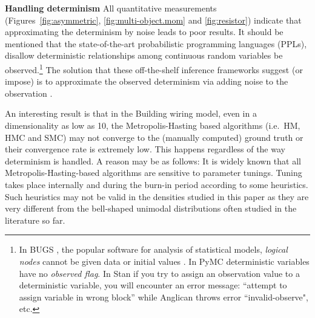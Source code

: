 \documentclass[]{article}
\begin{document}
{\bf Handling determinism}
All quantitative measurements 
(Figures~\ref{fig:asymmetric},  \ref{fig:multi-object.mom} and 
\ref{fig:resistor})
indicate that approximating the determinism by noise leads to poor results.
It should be mentioned that 
the state-of-the-art probabilistic programming languages (PPLs),
disallow deterministic relationships among continuous random variables 
be observed.\footnote{
In BUGS \citep{lunn2009bugs}, the popular software for analysis of statistical models, \emph{logical nodes} cannot be given data or initial values .
In PyMC \citep{patil2010pymc} deterministic variables have no \emph{observed flag}. 
In Stan \citep{stan-manual:2014} 
if you try to assign an observation value to a deterministic variable, you will encounter an error message: 
``attempt to assign variable in wrong block'' while 
Anglican \citep{wood2014new} throws error ``invalid-observe", etc.}
The solution that these off-the-shelf inference frameworks suggest (or impose) is to approximate the observed determinism via adding noise to the observation 
\citep{wood2014new}.





An interesting result is that in the Building wiring model, even in a dimensionality as low as 10, 
the Metropolis-Hasting based algorithms (i.e.\ HM, HMC and SMC) may not converge to the (manually computed) ground truth or their convergence rate is extremely low. 
This happens regardless of the way determinism is handled. 
A reason may be as follows:
It is widely known that all Metropolis-Hasting-based algorithms are sensitive to parameter tunings.
Tuning takes place internally and during the burn-in period according to some heuristics.
Such heuristics may not be valid in the densities studied in this paper as they are very different from the bell-shaped unimodal distributions often studied in the literature so far.

\end{document}
